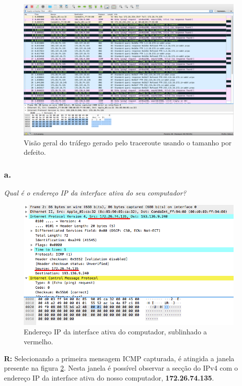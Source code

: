 \documentclass{llncs}
\begin{document}
\begin{figure}[H]
\includegraphics[scale=0.30]{2.png} 
\caption{\label{fig:2}Visão geral do tráfego gerado pelo traceroute usando o tamanho por defeito.}
\end{figure}

\subsubsection{a.}
\emph{Qual é o endereço IP da interface ativa
do 
seu computador?}

\begin{figure}
\begin{center}
\includegraphics[scale=0.45]{2_a.png} 
\end{center}
\caption{\label{fig:2_a}Endereço IP da interface ativa do computador, sublinhado a vermelho.}
\end{figure}

\textbf{R:} Selecionando a primeira mensagem ICMP capturada, é atingida a janela presente na figura \ref{fig:2_a}. Nesta janela é possível observar a secção do IPv4 com o endereço IP da interface ativa do nosso computador, \textbf{172.26.74.135}. 
\end{document}
